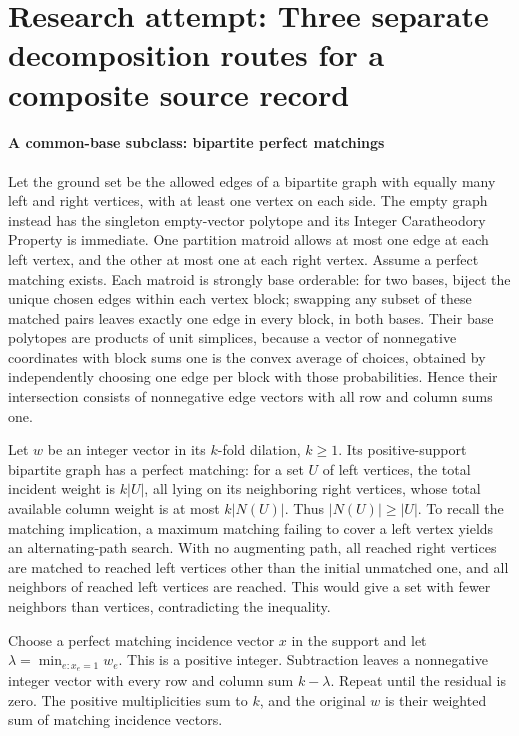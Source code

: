 \documentclass[11pt]{article}
\begin{document}
\section{Research attempt: Three separate decomposition routes for a composite source record}

\paragraph{A common-base subclass: bipartite perfect matchings}
Let the ground set be the allowed edges of a bipartite graph with equally many left and right vertices, with at least one vertex on each side. The empty graph instead has the singleton empty-vector polytope and its Integer Caratheodory Property is immediate. One partition matroid allows at most one edge at each left vertex, and the other at most one at each right vertex. Assume a perfect matching exists. Each matroid is strongly base orderable: for two bases, biject the unique chosen edges within each vertex block; swapping any subset of these matched pairs leaves exactly one edge in every block, in both bases. Their base polytopes are products of unit simplices, because a vector of nonnegative coordinates with block sums one is the convex average of choices, obtained by independently choosing one edge per block with those probabilities. Hence their intersection consists of nonnegative edge vectors with all row and column sums one.

Let $w$ be an integer vector in its $k$-fold dilation, $k\geq1$. Its positive-support bipartite graph has a perfect matching: for a set $U$ of left vertices, the total incident weight is $k|U|$, all lying on its neighboring right vertices, whose total available column weight is at most $k|N(U)|$. Thus $|N(U)|\geq|U|$. To recall the matching implication, a maximum matching failing to cover a left vertex yields an alternating-path search. With no augmenting path, all reached right vertices are matched to reached left vertices other than the initial unmatched one, and all neighbors of reached left vertices are reached. This would give a set with fewer neighbors than vertices, contradicting the inequality.

Choose a perfect matching incidence vector $x$ in the support and let $\lambda=\min_{e:x_e=1}w_e$. This is a positive integer. Subtraction leaves a nonnegative integer vector with every row and column sum $k-\lambda$. Repeat until the residual is zero. The positive multiplicities sum to $k$, and the original $w$ is their weighted sum of matching incidence vectors.
\end{document}
